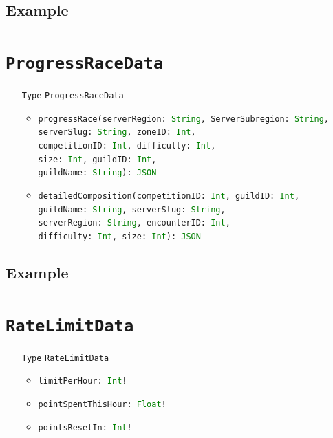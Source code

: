 \documentclass[10pt, a4paper]{memoir}
\numberwithin{equation}{section}
\theoremstyle{plain}
\theoremstyle{defp}
\theoremstyle{dotless}
\theoremstyle{definition}
\theoremstyle{dotless}
\theoremstyle{dotless}
\theoremstyle{defp}
\theoremstyle{defp}
\theoremstyle{be}          %
\theoremstyle{defp}
\newcommand\ttt[1]{\texttt{#1}}
\newcommand\type[1]{\ttt{\textcolor{green}{#1}}}
\begin{document}
\subsection{Example}

\newpage




\section{\ttt{ProgressRaceData}}\label{sec:ProgressRaceData}

\begin{itemize}[noitemsep,topsep=1pt]
	\item[\ttt{Type}] \ttt{ProgressRaceData}
	\begin{itemize}[itemsep=1pt,topsep=1pt]
		\item \ttt{progressRace(serverRegion: \type{String}, ServerSubregion: \type{String}, \\serverSlug: \type{String}, zoneID: \type{Int}, \\competitionID: \type{Int}, difficulty: \type{Int}, \\size: \type{Int}, guildID: \type{Int}, \\guildName: \type{String}): \type{JSON}}
		\item \ttt{detailedComposition(competitionID: \type{Int}, guildID: \type{Int}, \\guildName: \type{String}, serverSlug: \type{String}, \\serverRegion: \type{String}, encounterID: \type{Int}, \\difficulty: \type{Int}, size: \type{Int}): \type{JSON}}
	\end{itemize}
\end{itemize}

\subsection{Example}

\newpage




\section{\ttt{RateLimitData}}\label{sec:RateLimitData}

\begin{itemize}[noitemsep,topsep=1pt]
\item[\ttt{Type}] \ttt{RateLimitData}
\begin{itemize}[itemsep=1pt,topsep=1pt]
\item \ttt{limitPerHour: \type{Int}!}
\item \ttt{pointSpentThisHour: \type{Float}!}
\item \ttt{pointsResetIn: \type{Int}!}
\end{itemize}
\end{itemize}
\end{document}
